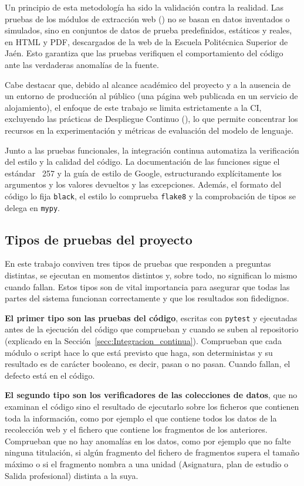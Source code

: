 Un principio de esta metodología ha sido la validación contra la realidad. Las pruebas de los módulos de extracción web () no se basan en datos inventados o simulados, sino en conjuntos de datos de prueba predefinidos, estáticos y reales, en HTML y PDF, descargados de la web de la Escuela Politécnica Superior de Jaén. Esto garantiza que las pruebas verifiquen el comportamiento del código ante las verdaderas anomalías de la fuente.

Cabe destacar que, debido al alcance académico del proyecto y a la ausencia de un entorno de producción al público (una página web publicada en un servicio de alojamiento), el enfoque de este trabajo se limita estrictamente a la CI, excluyendo las prácticas de Despliegue Continuo (), lo que permite concentrar los recursos en la experimentación y métricas de evaluación del modelo de lenguaje.

Junto a las pruebas funcionales, la integración continua automatiza la verificación del estilo y la calidad del código. La documentación de las funciones sigue el estándar ~257\cite{pep257} y la guía de estilo de Google\cite{googlestyle}, estructurando explícitamente los argumentos y los valores devueltos y las excepciones. Además, el formato del código lo fija \texttt{black}, el estilo lo comprueba \texttt{flake8} y la comprobación de tipos se delega en \texttt{mypy}.

\subsection{Tipos de pruebas del proyecto}
\label{secc:niveles_de_prueba}

En este trabajo conviven tres tipos de pruebas que responden a preguntas distintas, se ejecutan
en momentos distintos y, sobre todo, no significan lo mismo cuando fallan. Estos tipos son de vital importancia
para asegurar que todas las partes del sistema funcionan correctamente y que los resultados son fidedignos.

\textbf{El primer tipo son las pruebas del código}, escritas con
\texttt{pytest} y ejecutadas antes de la ejecución del código que comprueban y cuando se suben al repositorio (explicado en la Sección~\ref{secc:Integracion_continua}). Comprueban que cada módulo o script hace lo que está previsto que haga, son deterministas y su resultado es de carácter booleano, es decir, pasan o no pasan. Cuando fallan, el defecto está en el código.

\textbf{El segundo tipo son los verificadores de las colecciones de datos}, que no examinan el código sino el resultado de ejecutarlo sobre los ficheros que contienen toda la información, como por ejemplo el que contiene todos los datos de la recolección web y el fichero que contiene los fragmentos de los anteriores. Comprueban que no hay anomalías en los datos, como por ejemplo que no falte ninguna titulación, si algún fragmento del fichero de fragmentos supera el tamaño máximo o si el fragmento nombra a una unidad (Asignatura, plan de estudio o Salida profesional) distinta a la suya.

